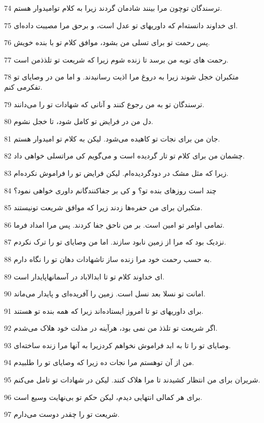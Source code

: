 \par 74 ترسندگان توچون مرا بینند شادمان گردند زیرا به کلام توامیدوار هستم.
\par 75 ‌ای خداوند دانسته‌ام که داوریهای تو عدل است، و بر‌حق مرا مصیبت داده‌ای.
\par 76 پس رحمت تو برای تسلی من بشود، موافق کلام تو با بنده خویش.
\par 77 رحمت های توبه من برسد تا زنده شوم زیرا که شریعت تو تلذذمن است.
\par 78 متکبران خجل شوند زیرا به دروغ مرا اذیت رسانیدند. و اما من در وصایای تو تفکرمی کنم.
\par 79 ترسندگان تو به من رجوع کنند و آنانی که شهادات تو را می‌دانند.
\par 80 دل من در فرایض تو کامل شود، تا خجل نشوم.
\par 81 جان من برای نجات تو کاهیده می‌شود. لیکن به کلام تو امیدوار هستم.
\par 82 چشمان من برای کلام تو تار گردیده است و می‌گویم کی مراتسلی خواهی داد.
\par 83 زیرا که مثل مشک در دودگردیده‌ام. لیکن فرایض تو را فراموش نکرده‌ام.
\par 84 چند است روزهای بنده تو؟ و کی بر جفاکنندگانم داوری خواهی نمود؟
\par 85 متکبران برای من حفره‌ها زدند زیرا که موافق شریعت تونیستند.
\par 86 تمامی اوامر تو امین است. بر من ناحق جفا کردند. پس مرا امداد فرما.
\par 87 نزدیک بود که مرا از زمین نابود سازند. اما من وصایای تو را ترک نکردم.
\par 88 به حسب رحمت خود مرا زنده ساز تاشهادات دهان تو را نگاه دارم.
\par 89 ‌ای خداوند کلام تو تا ابدالاباد در آسمانهاپایدار است.
\par 90 امانت تو نسلا بعد نسل است. زمین را آفریده‌ای و پایدار می‌ماند.
\par 91 برای داوریهای تو تا امروز ایستاده‌اند زیرا که همه بنده تو هستند.
\par 92 اگر شریعت تو تلذذ من نمی بود، هرآینه در مذلت خود هلاک می‌شدم.
\par 93 وصایای تو را تا به ابد فراموش نخواهم کردزیرا به آنها مرا زنده ساخته‌ای.
\par 94 من از آن توهستم مرا نجات ده زیرا که وصایای تو را طلبیدم.
\par 95 شریران برای من انتظار کشیدند تا مرا هلاک کنند. لیکن در شهادات تو تامل می‌کنم.
\par 96 برای هر کمالی انتهایی دیدم، لیکن حکم تو بی‌نهایت وسیع است.
\par 97 شریعت تو را چقدر دوست می‌دارم.
